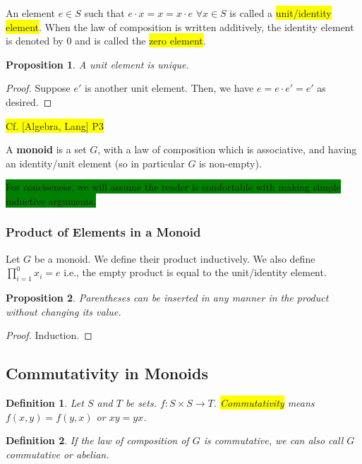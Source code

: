 \documentclass[12pt]{article}
\newcommand{\mybox}[2][black]{\colorbox{#1}{#2}}
\newtheorem{definition}{Definition}
\newtheorem{proposition}{Proposition}
\begin{document}
An element $e \in S$ such that $e \cdot x = x = x \cdot e$ $\forall x \in S$ is called a \mybox[yellow]{unit/identity element}. When the law of composition is written additively, the identity element is denoted by $0$ and is called the \mybox[yellow]{zero element}.

\begin{proposition}
A unit element is unique.
\end{proposition}
\begin{proof}
Suppose $e'$ is another unit element. Then, we have $e = e \cdot e' = e'$ as desired.
\end{proof}
\mybox[yellow]{Cf. [Algebra, Lang] P3}

A \textbf{monoid} is a set $G$, with a law of composition which is associative, and having an identity/unit element (so in particular $G$ is non-empty).

\mybox[green]{For conciseness, we will assume the reader is comfortable with making simple inductive arguments.}

\subsubsection{Product of Elements in a Monoid}
Let $G$ be a monoid. We define their product inductively. We also define $\prod_{i=1}^{0} x_{i} = e$ i.e., the empty product is equal to the unit/identity element.

\begin{proposition}
Parentheses can be inserted in any manner in the product without changing its value. 
\end{proposition}

\begin{proof}
Induction.
\end{proof}



\subsection{Commutativity in Monoids}
\begin{definition}
Let $S$ and $T$ be sets. $f: S \times S \rightarrow T$. \mybox[yellow]{Commutativity} means $f(x,y) = f(y,x)$ or $xy = yx$.
\end{definition}

\begin{definition}
If the law of composition of $G$ is commutative, we can also call $G$ commutative or abelian.
\end{definition}
\end{document}
